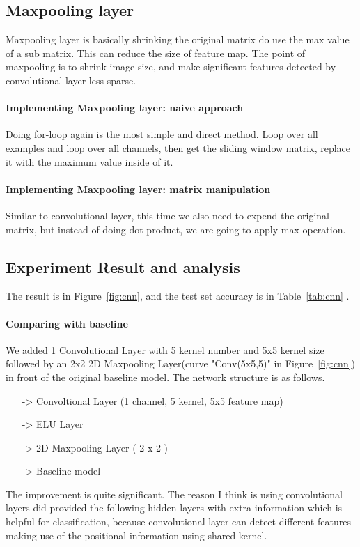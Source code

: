 \documentclass{article}
\begin{document}
\subsection{Maxpooling layer}
Maxpooling layer is basically shrinking the original matrix do use the max value of a sub matrix. This can reduce the size of feature map. The point of maxpooling is to shrink image size, and make significant features detected by convolutional layer less sparse. 
\paragraph{Implementing Maxpooling layer: naive approach}
Doing for-loop again is the most simple and direct method. Loop over all examples and loop over all channels, then get the sliding window matrix, replace it with the maximum value inside of it.

\paragraph{Implementing Maxpooling layer: matrix manipulation}
Similar to convolutional layer, this time we also need to expend the original matrix, but instead of doing dot product, we are going to apply max operation.

\subsection{Experiment Result and analysis}
The result is in Figure~\ref{fig:cnn}, and the test set accuracy is in Table~\ref{tab:cnn} . 
\paragraph{Comparing with baseline} 
We added 1 Convolutional Layer with 5 kernel number and 5x5 kernel size followed by an 2x2 2D Maxpooling Layer(curve "Conv(5x5,5)" in Figure~\ref{fig:cnn}) in front of the original baseline model. The network structure is as follows.

\begin{itemize}
	\item[->] Convoltional Layer (1 channel, 5 kernel, 5x5 feature map)
	\item[->] ELU Layer
	\item[->] 2D Maxpooling Layer ( 2 x 2 )
	\item[->] Baseline model
\end{itemize}

The improvement is quite significant. The reason I think is using convolutional layers did provided the following hidden layers with extra information which is helpful for classification, because convolutional layer can detect different features making use of the positional information using shared kernel. 
\end{document}
